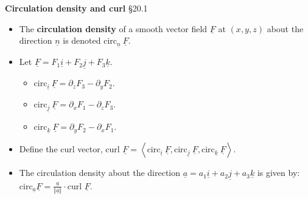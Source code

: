 \documentclass[12pt,letterpaper,noanswers]{exam}
\newcommand{\mb}[1]{\underline{#1}}
\begin{document}
\vspace{1in}

\noindent\textbf{Circulation density and curl} \S 20.1
\begin{tcolorbox}
\begin{itemize}
\itemsep0em
    \item  The \textbf{circulation density} of a smooth vector field $\mb F$ at $(x,y,z)$ about the direction $\mb n$ is denoted $\text{circ}_{\mb n}\ \mb F$. 
    \item Let $\mb F = F_1\mb i + F_2\mb j + F_3\mb k$. 
    \begin{itemize}
    \itemsep0em
        \item $\text{circ}_{\mb i}\ \mb F = \partial_z F_3 - \partial_y F_2$. 
        \item $\text{circ}_{\mb j}\ \mb F = \partial_x F_1 - \partial_z F_3$. 
        \item $\text{circ}_{\mb k}\ \mb F = \partial_y F_2 - \partial_x F_1$. 
    \end{itemize}
    \item Define the curl vector, $\text{curl }\mb F = \left\langle \text{circ}_{\mb i}\ \mb F, \text{circ}_{\mb j}\ \mb F, \text{circ}_{\mb k}\ \mb F\right\rangle$.  
    \item The circulation density about the direction $\mb a = a_1\mb i + a_2\mb j + a_3\mb k$ is given by: $\text{circ}_{\mb a} \mb F = \displaystyle\frac{\mb a}{\Vert \mb a \Vert} \cdot \text{curl }\mb F$.
\end{itemize}
\end{tcolorbox}
\end{document}
